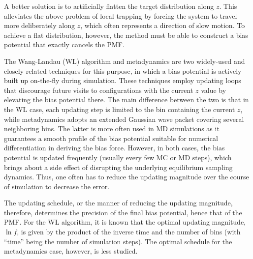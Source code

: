 \documentclass[reprint, floatfix]{revtex4-1}
\begin{document}
A better solution is to artificially flatten
the target distribution along $z$\cite{mezei1987, berg1992, lee1993,
wang2001, wang2001pre, laio2002, laio2008, barducci2011, sutto2012}.
%
This alleviates the above problem of local trapping
by forcing the system to travel more
deliberately along $z$,
which often represents
a direction of slow motion.
%
To achieve a flat distribution, however,
the method must be able to construct a
bias potential that exactly cancels the PMF.



The Wang-Landau (WL) algorithm\cite{wang2001, wang2001pre}
and meta\-dy\-nam\-ics\cite{huber1994, laio2002,
laio2008, barducci2011, sutto2012}
are two widely-used and closely-related\cite{micheletti2004}
techniques for this purpose,
in which a bias potential is actively built up on-the-fly
during simulation.
%
These techniques employ updating loops
that discourage future visits to configurations
with the current $z$ value
by elevating the bias potential there.
%
The main difference between the two
is that in the WL case,
each updating step is limited to the bin
containing the current $z$,
while metadynamics adopts an extended
Gaussian wave packet
covering several neighboring bins.
%
The latter is more often used in MD simulations
as it guarantees a smooth profile
of the bias potential
suitable for numerical differentiation
in deriving the bias force.
%
However, in both cases, the bias potential
is updated frequently (usually every few MC or MD steps),
which brings about a side effect
of disrupting the underlying
equilibrium sampling dynamics\cite{laio2002}.
%
Thus, one often has to reduce
the updating magnitude
over the course of simulation
to decrease the error.



The updating schedule,
or the manner of reducing
the updating magnitude\cite{liang2007,
belardinelli2007, belardinelli2007jcp, belardinelli2008,
morozov2007, zhou2008, morozov2009,
komura2012, caparica2012, caparica2014,
barducci2008, dickson2011, dama2014},
therefore,
determines the precision of the final bias potential,
hence that of the PMF.
%
For the WL algorithm, it is known
that the optimal updating magnitude, $\ln f$,
is given by the product of the
inverse time\cite{liang2007,
belardinelli2007, belardinelli2007jcp, belardinelli2008,
morozov2007, zhou2008}
and the number of bins
(with ``time'' being
the number of simulation steps).
%
The optimal schedule for the metadynamics case,
however, is less studied.
\end{document}
